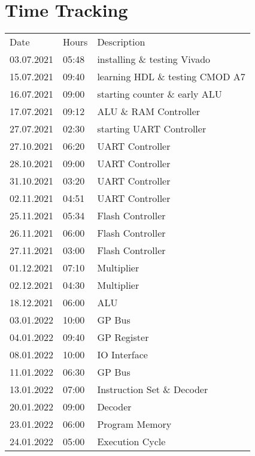 \listoffigures
{}
\pagebreak


\printbibliography
{}
\pagebreak


\section*{Time Tracking}
\begin{tabular}{|p{21mm}|p{12mm}|p{70mm}|}
    \rowcolor{gray!50}
    Date & Hours & Description \\
    03.07.2021 & 05:48 & installing \& testing Vivado\\
    15.07.2021 & 09:40 & learning HDL \& testing CMOD A7\\
    16.07.2021 & 09:00 & starting counter \& early ALU\\
    17.07.2021 & 09:12 & ALU \& RAM Controller \\
    27.07.2021 & 02:30 & starting UART Controller \\
    27.10.2021 & 06:20 & UART Controller \\
    28.10.2021 & 09:00 & UART Controller \\
    31.10.2021 & 03:20 & UART Controller \\
    02.11.2021 & 04:51 & UART Controller \\
    25.11.2021 & 05:34 & Flash Controller \\
    26.11.2021 & 06:00 & Flash Controller \\
    27.11.2021 & 03:00 & Flash Controller \\
    01.12.2021 & 07:10 & Multiplier \\
    02.12.2021 & 04:30 & Multiplier \\
    18.12.2021 & 06:00 & ALU \\
    03.01.2022 & 10:00 & GP Bus \\
    04.01.2022 & 09:40 & GP Register \\
    08.01.2022 & 10:00 & IO Interface \\
    11.01.2022 & 06:30 & GP Bus \\
    13.01.2022 & 07:00 & Instruction Set \& Decoder\\
    20.01.2022 & 09:00 & Decoder \\
    23.01.2022 & 06:00 & Program Memory \\
    24.01.2022 & 05:00 & Execution Cycle \\

\end{tabular}
